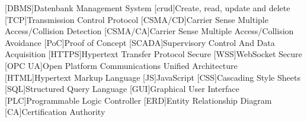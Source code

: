 \begin{multicols}{2}
  \begin{acronym}
  [DBMS]{Datenbank Management  System}
  [crud]{Create, read, update and delete}
  [TCP]{Transmission Control Protocol}
  [CSMA/CD]{Carrier Sense Multiple Access/Collision Detection}
  [CSMA/CA]{Carrier Sense Multiple Access/Collision Avoidance}
  [PoC]{Proof of Concept}
  [SCADA]{Supervisory Control And Data Acquisition}
  [HTTPS]{Hypertext Transfer Protocol Secure}
  [WSS]{WebSocket Secure}
  [OPC UA]{Open Platform Communications Unified Architecture}
  [HTML]{Hypertext Markup Language}
  [JS]{JavaScript}
  [CSS]{Cascading Style Sheets}
  [SQL]{Structured Query Language}
  [GUI]{Graphical User Interface}
  [PLC]{Programmable Logic Controller}
  [ERD]{Entity Relationship Diagram}
  [CA]{Certification Authority}
\end{acronym}
\end{multicols}

